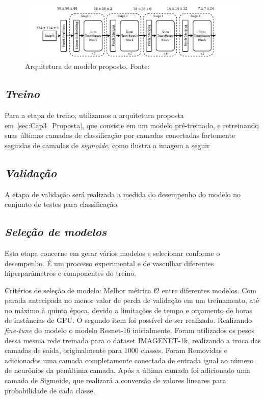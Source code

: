 \begin{figure}[!ht]
    \centering
    \includegraphics[width=0.9\columnwidth]{Imagens/swin proposto.png}
    \caption{ Arquitetura de modelo proposto.
    Fonte: \cite{liu2022swin}}
   \label{fig:Swin-T-Rsp}
\end{figure}



\subsection{\textit{Treino}}\label{sec:Cap3_Treino}

Para a etapa de treino, utilizamos a arquitetura proposta em~\ref{sec:Cap3_Proposta}, que consiste em um modelo pré-treinado, e retreinando suas últimas camadas de classificação por camadas conectadas fortemente seguidas de camadas de \textit{sigmoide}, como ilustra a imagem a seguir


\subsection{\textit{Validação}}\label{sec:Cap3_Validacao}

A etapa de validação será realizada a medida do desempenho do modelo no conjunto de testes para classificação.

\subsection{\textit{Seleção de modelos}}\label{sec:Cap3_SelecaoModelos}

Esta etapa concerne em gerar vários modelos e selecionar conforme o desempenho. É um processo experimental e de vasculhar diferentes hiperparâmetros e componentes do treino.



Critérios de seleção de modelo:
Melhor métrica f2 entre diferentes modelos. Com parada antecipada no menor valor de perda de validação em um treinamento, até no máximo à quinta época, devido a limitações de tempo e orçamento de horas de instâncias de GPU.
O segundo item foi possível de ser realizado. Realizando \textit{fine-tune} do modelo o modelo Resnet-16 inicialmente. Foram utilizados os pesos dessa mesma rede treinada para o dataset IMAGENET-1k, realizando a troca das camadas de saída, originalmente para 1000 classes. Foram Removidas e adicionados uma camada completamente conectada de entrada igual ao número de neurônios da penúltima camada. Após a última camada foi adicionado uma camada de Sigmoide, que realizará a conversão de valores lineares para probabilidade de cada classe.

